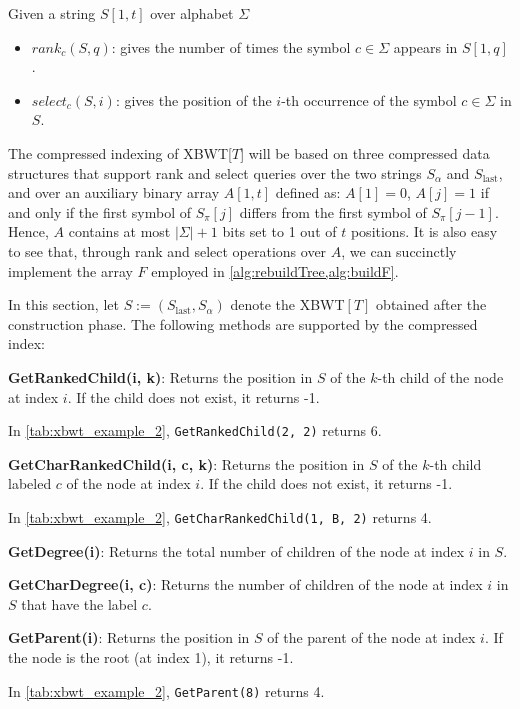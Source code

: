 Given a string $S[1, t]$ over alphabet $\Sigma$
\begin{itemize}
    \item \textbf{$rank_c(S, q)$}: gives the number of times the symbol $c \in \Sigma$ appears in $S[1, q]$.
    \item \textbf{$select_c(S, i)$}: gives the position of the $i$-th occurrence of the symbol $c \in \Sigma$ in $S$.
\end{itemize}

The compressed indexing of XBWT[$T$] will be based on three compressed data structures that support rank and select queries over the two strings $S_{\alpha}$ and $S_{\text{last}}$, and over an auxiliary binary array $A[1, t]$ defined as: $A[1] = 0$, $A[j] = 1$ if and only if the first symbol of $S_{\pi}[j]$ differs from the first symbol of $S_{\pi}[j - 1]$. 
Hence, $A$ contains at most $|\Sigma| + 1$ bits set to 1 out of $t$ positions. It is also easy to see that, through rank and select operations over $A$, we can succinctly implement the array $F$ employed in \cref{alg:rebuildTree,alg:buildF}.

In this section, let $S := (S_{\text{last}}, S_{\alpha})$ denote the XBWT$[T]$ obtained after the construction phase. The following methods are supported by the compressed index:

\textbf{GetRankedChild(i, k)}: Returns the position in $S$ of the $k$-th child of the node at index $i$. If the child does not exist, it returns -1. 
\begin{example}
    In \cref{tab:xbwt_example_2}, \texttt{GetRankedChild(2, 2)} returns 6.
\end{example}

\textbf{GetCharRankedChild(i, c, k)}: Returns the position in $S$ of the $k$-th child labeled $c$ of the node at index $i$. If the child does not exist, it returns -1.
\begin{example}
    In \cref{tab:xbwt_example_2}, \texttt{GetCharRankedChild(1, B, 2)} returns 4.
\end{example}

\textbf{GetDegree(i)}: Returns the total number of children of the node at index $i$ in $S$.

\textbf{GetCharDegree(i, c)}: Returns the number of children of the node at index $i$ in $S$ that have the label $c$.

\textbf{GetParent(i)}: Returns the position in $S$ of the parent of the node at index $i$. If the node is the root (at index 1), it returns -1.
\begin{example}
    In \cref{tab:xbwt_example_2}, \texttt{GetParent(8)} returns 4.
\end{example}

